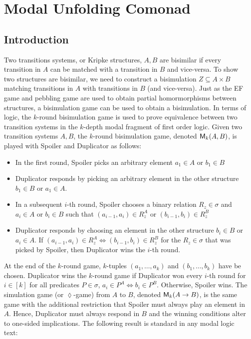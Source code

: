 \chapter{Modal Unfolding Comonad}
\section{Introduction}
Two transitions systems, or Kripke structures, $A,B$ are bisimilar if every transition in $A$ can be matched with a transition in $B$ and vice-versa. To show two structures are bisimilar, we need to construct a bisimulation $Z \subseteq A \times B$ matching transitions in $A$ with transitions in $B$ (and vice-versa). Just as the EF game and pebbling game are used to obtain partial homormorphisms between structures, a bisimulation game can be used to obtain a bisimulation. In terms of logic, the $k$-round bisimulation game is used to prove equivalence between two transition systems in the $k$-depth modal fragment of first order logic. Given two transition systems $A,B$, the $k$-round bisimulation game, denoted ${\mathsf{M}_{k}(A,B)}$, is played with Spoiler and Duplicator as follows: 
\begin{itemize} 
\item In the first round, Spoiler picks an arbitrary element $a_{1} \in A$ or $b_{1} \in B$
\item Duplicator responds by picking an arbitrary element in the other structure $b_{1} \in B$ or $a_{1} \in A$.
\item In a subsequent $i$-th round, Spoiler chooses a binary relation $R_{z} \in \sigma$ and $a_{i} \in A$ or $b_{i} \in B$ such that $(a_{i-1},a_{i}) \in R_{z}^{A}$ or $(b_{i-1},b_{i}) \in R_{z}^{B}$
\item Duplicator responds by choosing an element in the other structure $b_{i} \in B$ or $a_{i} \in A$. If $(a_{i-1},a_{i}) \in R_{z}^{A} \Leftrightarrow (b_{i-1},b_{i}) \in R_{z}^{B}$ for the $R_{z} \in \sigma$ that was picked by Spoiler, then Duplicator wins the $i$-th round.  
\end{itemize}
At the end of the $k$-round game, $k$-tuples $(a_{1},\dots,a_{k})$ and $(b_{1},\dots,b_{k})$ have be chosen. Duplicator wins the $k$-round game if Duplicator won every $i$-th round for $i \in [k]$ for all predicates $P \in \sigma$, $a_{i} \in P^{A} \Leftrightarrow b_{i} \in P^{B}$. Otherwise, Spoiler wins. The simulation game (or $\lozenge$-game) from $A$ to $B$, denoted ${\mathsf{M}_{k}(A \rightarrow B)}$, is the same game with the additional restriction that Spoiler must always play an element in $A$. Hence, Duplicator must always respond in $B$ and the winning conditions alter to one-sided implications. The following result is standard in any modal logic text: 
